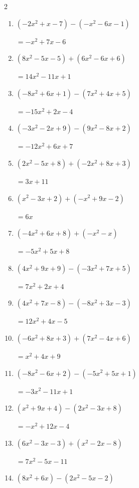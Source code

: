 \begin{multicols}{2}
\begin{enumerate}
        $=-7x^{2}-4x+1$

  \item $(-2x^{2}+x-7)-(-x^{2}-6x-1)$

        $=-x^{2}+7x-6$

  \item $(8x^{2}-5x-5)+(6x^{2}-6x+6)$

        $=14x^{2}-11x+1$

  \item $(-8x^{2}+6x+1)-(7x^{2}+4x+5)$

        $=-15x^{2}+2x-4$

  \item $(-3x^{2}-2x+9)-(9x^{2}-8x+2)$

        $=-12x^{2}+6x+7$

  \item $(2x^{2}-5x+8)+(-2x^{2}+8x+3)$

        $=3x+11$

  \item $(x^{2}-3x+2)+(-x^{2}+9x-2)$

        $=6x$

  \item $(-4x^{2}+6x+8)+(-x^{2}-x)$

        $=-5x^{2}+5x+8$

  \item $(4x^{2}+9x+9)-(-3x^{2}+7x+5)$

        $=7x^{2}+2x+4$

  \item $(4x^{2}+7x-8)-(-8x^{2}+3x-3)$

        $=12x^{2}+4x-5$

  \item $(-6x^{2}+8x+3)+(7x^{2}-4x+6)$

        $=x^{2}+4x+9$

  \item $(-8x^{2}-6x+2)-(-5x^{2}+5x+1)$

        $=-3x^{2}-11x+1$

  \item $(x^{2}+9x+4)-(2x^{2}-3x+8)$

        $=-x^{2}+12x-4$

  \item $(6x^{2}-3x-3)+(x^{2}-2x-8)$

        $=7x^{2}-5x-11$

\columnbreak %

  \item $(8x^{2}+6x)-(2x^{2}-5x-2)$


\end{enumerate}
\end{multicols}
